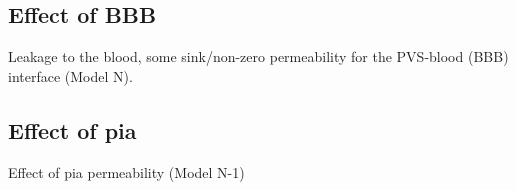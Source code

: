 \documentclass[fleqn,10pt]{wlscirep}
\begin{document}
\subsection*{Effect of BBB}

Leakage to the blood, some sink/non-zero permeability for the PVS-blood (BBB) interface (Model N).

\begin{figure}
    \caption{}
    \label{fig:3}
\end{figure}

\subsection*{Effect of pia}
  
Effect of pia permeability (Model N-1)    

\begin{figure}
    \caption{}
    \label{fig:4}
\end{figure}
\end{document}
